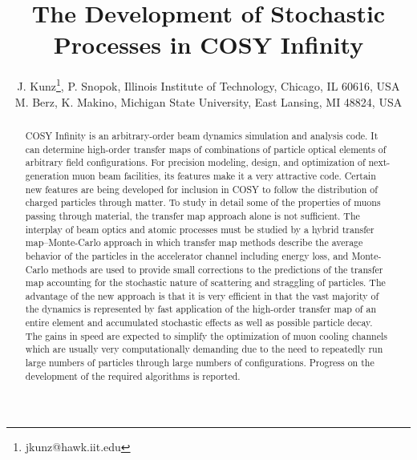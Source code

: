 \documentclass{jacow}
\begin{document}
\title{The Development of Stochastic Processes in COSY Infinity}

\author{J. Kunz\thanks{jkunz@hawk.iit.edu}, P. Snopok, Illinois Institute of Technology, Chicago, IL 60616, USA\\
        M. Berz, K. Makino, Michigan State University, East Lansing, MI 48824, USA}

\maketitle

\begin{abstract}
COSY Infinity is an arbitrary-order beam dynamics simulation and analysis code. It can determine high-order transfer maps of combinations of particle optical elements of arbitrary field configurations. For precision modeling, design, and optimization of next-generation muon beam facilities, its features make it a very attractive code. Certain new features are being developed for inclusion in COSY to follow the distribution of charged particles through matter. To study in detail some of the properties of muons passing through material, the transfer map approach alone is not sufficient. The interplay of beam optics and atomic processes must be studied by a hybrid transfer map--Monte-Carlo approach in which transfer map methods describe the average behavior of the particles in the accelerator channel including energy loss, and Monte-Carlo methods are used to provide small corrections to the predictions of the transfer map accounting for the stochastic nature of scattering and straggling of particles. The advantage of the new approach is that it is very efficient in that the vast majority of the dynamics is represented by fast application of the high-order transfer map of an entire element and accumulated stochastic effects as well as possible particle decay. The gains in speed are expected to simplify the optimization of muon cooling channels which are usually very computationally demanding due to the need to repeatedly run large numbers of particles through large numbers of configurations. Progress on the development of the required algorithms is reported.
\end{abstract}
\end{document}
